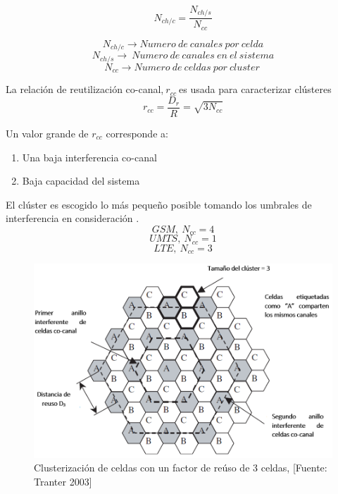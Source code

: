 \begin{equation}
N_{ch/c}=\frac{N_{ch/s}}{N_{cc}} 
\label{eqn:Nch}
\end{equation}

\[N_{ch/c}\to Numero\ de\ canales\ por\ celda\] 
\[N_{ch/s}\to \ Numero\ de\ canales\ en\ el\ sistema\] 
\[N_{cc}\to Numero\ de\ celdas\ por\ cluster\ \] 

La relación de reutilización co-canal,$\ r_{cc}\ $es usada para caracterizar clústeres\newline
\begin{equation}
r_{cc}=\frac{D_r}{R}=\sqrt{3N_{cc}}
\label{eqn:}
\end{equation}

Un valor grande de $r_{cc}$ corresponde a:\newline
\begin{enumerate}
\item  Una baja interferencia co-canal
\item  Baja capacidad del sistema
\end{enumerate}

El clúster es escogido lo más pequeño posible tomando los umbrales de interferencia en consideración \parencite{Correia2018}.\newline
\[GSM,\ {N}_{cc}=4\] 
\[UMTS,\ {N}_{cc}=1\] 
\[LTE,\ {N}_{cc}=3\] 

\begin{figure}[th]
\centering
\includegraphics[scale=.4]{Figures/Clusterización de celdas con un factor de reúso de 3 celdas}
\decoRule
\caption[Clusterización de celdas con un factor de reúso de 3 celdas]{Clusterización de celdas con un factor de reúso de 3 celdas, [Fuente: Tranter 2003]}
\label{fig:clusterizacion}
\end{figure}

